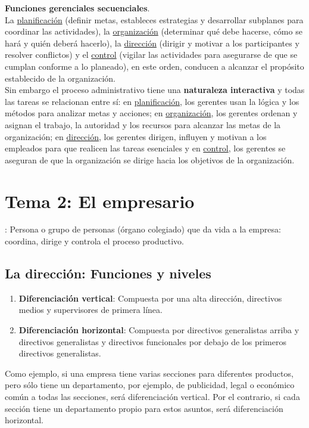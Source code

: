 \documentclass[12pt]{article}
\theoremstyle{definition_wo_parentheses}
\begin{document}
\textbf{Funciones gerenciales secuenciales}.\\
La \underline{planificación} (definir metas, estableces estrategias y desarrollar subplanes para coordinar las actividades), la \underline{organización} (determinar qué debe hacerse, cómo se hará y quién deberá hacerlo), la \underline{dirección} (dirigir y motivar a los participantes y resolver conflictos) y el \underline{control} (vigilar las actividades para asegurarse de que se cumplan conforme a lo planeado), en este orden, conducen a alcanzar el propósito establecido de la organización.\\

Sin embargo el proceso administrativo tiene una \textbf{naturaleza interactiva} y todas las tareas se relacionan entre sí: en \underline{planificación}, los gerentes usan la lógica y los métodos para analizar metas y acciones; en \underline{organización}, los gerentes ordenan y asignan el trabajo, la autoridad y los recursos para alcanzar las metas de la organización; en \underline{dirección}, los gerentes dirigen, influyen y motivan a los empleados para que realicen las tareas esenciales y en \underline{control}, los gerentes se aseguran de que la organización se dirige hacia los objetivos de la organización.

\section{Tema 2: El empresario}
: Persona o grupo de personas (órgano colegiado) que da vida a la empresa: coordina, dirige y controla el proceso productivo.

\subsection{La dirección: Funciones y niveles}
\begin{enumerate}
\item \textbf{Diferenciación vertical}: Compuesta por una alta dirección, directivos medios y supervisores de primera línea.
\item \textbf{Diferenciación horizontal}: Compuesta por directivos generalistas arriba y directivos generalistas y directivos funcionales por debajo de los primeros directivos generalistas.
\end{enumerate}

	Como ejemplo, si una empresa tiene varias secciones para diferentes productos, pero sólo tiene un departamento, por ejemplo, de publicidad, legal o económico común a todas las secciones, será diferenciación vertical. Por el contrario, si cada sección tiene un departamento propio para estos asuntos, será diferenciación horizontal.
\end{document}
